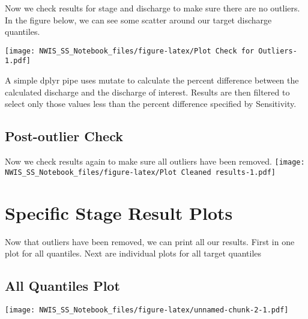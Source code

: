 \documentclass[]{article}
\newenvironment{Shaded}{\begin{snugshade}}{\end{snugshade}}
\newcommand{\KeywordTok}[1]{\textcolor[rgb]{0.13,0.29,0.53}{\textbf{#1}}}
\newcommand{\DataTypeTok}[1]{\textcolor[rgb]{0.13,0.29,0.53}{#1}}
\newcommand{\StringTok}[1]{\textcolor[rgb]{0.31,0.60,0.02}{#1}}
\newcommand{\OperatorTok}[1]{\textcolor[rgb]{0.81,0.36,0.00}{\textbf{#1}}}
\newcommand{\NormalTok}[1]{#1}
\begin{document}
Now we check results for stage and discharge to make sure there are no
outliers. In the figure below, we can see some scatter around our target
discharge quantiles.

\texttt{[image: NWIS\_SS\_Notebook\_files/figure-latex/Plot Check for Outliers-1.pdf]}

A simple dplyr pipe uses mutate to calculate the percent difference
between the calculated discharge and the discharge of interest. Results
are then filtered to select only those values less than the percent
difference specified by Sensitivity.

\begin{Shaded}
\end{Shaded}

\subsection{Post-outlier Check}\label{post-outlier-check}

Now we check results again to make sure all outliers have been removed.
\texttt{[image: NWIS\_SS\_Notebook\_files/figure-latex/Plot Cleaned results-1.pdf]}

\section{Specific Stage Result Plots}\label{specific-stage-result-plots}

Now that outliers have been removed, we can print all our results. First
in one plot for all quantiles. Next are individual plots for all target
quantiles

\subsection{All Quantiles Plot}\label{all-quantiles-plot}

\texttt{[image: NWIS\_SS\_Notebook\_files/figure-latex/unnamed-chunk-2-1.pdf]}
\end{document}
